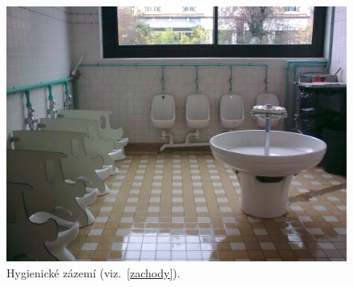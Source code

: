 	\begin{figure}[tb]
		\centering
		\includegraphics[height=0.35\textheight]{./fotky/Obr19.jpg}
		\caption{
			Hygienické zázemí (viz.~\ref{zachody}).
		}
		\label{Obr19}
	\end{figure}

